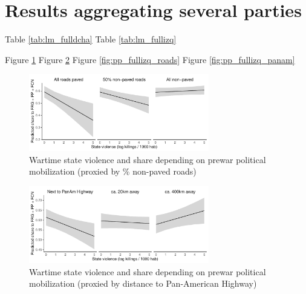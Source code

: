 \documentclass[a4paper, 12pt, notitlepage]{article}
\begin{document}



\clearpage
\section{Results aggregating several parties}\label{app:results_full}

Table \ref{tab:lm_fulldcha}
Table \ref{tab:lm_fullizq}

Figure \ref{fig:pp_fulldcha_roads}
Figure \ref{fig:pp_fulldcha_panam}
Figure \ref{fig:pp_fullizq_roads}
Figure \ref{fig:pp_fullizq_panam}




\begin{figure}[htb!]
  \centering
    \includegraphics[width = 0.7\textwidth]{img/pp_fulldcha_roads}

  \caption{Wartime state violence and {} share depending on prewar political mobilization (proxied by \% non-paved roads)} \label{fig:pp_fulldcha_roads}

\end{figure}

\begin{figure}[htb!]
  \centering
    \includegraphics[width = 0.7\textwidth]{img/pp_fulldcha_panam}

  \caption{Wartime state violence and {} share depending on prewar political mobilization (proxied by distance to Pan-American Highway)} \label{fig:pp_fulldcha_panam}

\end{figure}
\end{document}
